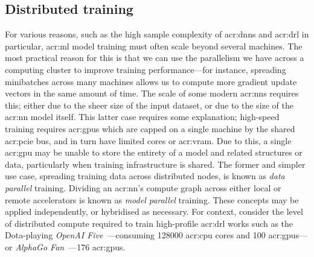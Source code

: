 \subsection{Distributed training}
For various reasons, such as the high sample complexity of \glspl{acr:dnn} and \gls{acr:drl} in particular, \gls{acr:ml} model training must often scale beyond several machines.
The most practical reason for this is that we can use the parallelism we have across a computing cluster to improve training performance---for instance, spreading minibatches across many machines allows us to compute more gradient update vectors in the same amount of time.
The scale of some modern \glspl{acr:nn} requires this; either due to the sheer size of the input dataset, or due to the size of the \gls{acr:nn} model itself.
This latter case requires some explanation; high-speed training requires \glspl{acr:gpu} which are capped on a single machine by the shared \gls{acr:pcie} bus, and in turn have limited cores or \gls{acr:vram}.
Due to this, a single \gls{acr:gpu} may be unable to store the entirety of a model and related structures or data, particularly when training infrastructure is shared.
The former and simpler use case, spreading training data across distributed nodes, is known as \emph{data parallel} training.
Dividing an \gls{acr:nn}'s compute graph across either local or remote accelerators is known as \emph{model parallel} training.
These concepts may be applied independently, or hybridised as necessary.
For context, consider the level of distributed compute required to train high-profile \gls{acr:drl} works such as the Dota-playing \emph{OpenAI Five}~\parencite{openai-five}---consuming \num{128000} \gls{acr:cpu} cores and \num{100} \glspl{acr:gpu}---or \emph{AlphaGo Fan}~\parencite{DBLP:journals/nature/SilverSSAHGHBLB17}---\num{176} \glspl{acr:gpu}. 	


